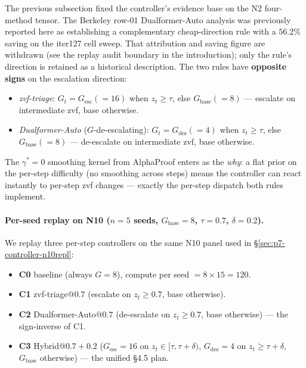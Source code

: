 The previous subsection fixed the controller's evidence base on the N2
four-method tensor. The Berkeley row-01 Dualformer-Auto analysis
\citep{su2024dualformer} was previously reported here as establishing a
complementary cheap-direction rule with a $56.2\%$ saving on the iter127
cell sweep. That attribution and saving figure are withdrawn (see
the replay audit boundary in the introduction); only the rule's
direction is retained as a historical description. The two rules have
\textbf{opposite signs} on the escalation direction:
\begin{itemize}
\item \emph{zvf-triage}: $G_t = G_{\mathrm{esc}} (=16)$ when $z_t \geq \tau$, else $G_{\mathrm{base}} (=8)$ --- escalate on intermediate zvf, base otherwise.
\item \emph{Dualformer-Auto} ($G$-de-escalating): $G_t = G_{\mathrm{des}} (=4)$ when $z_t \geq \tau$, else $G_{\mathrm{base}} (=8)$ --- de-escalate on intermediate zvf, base otherwise.
\end{itemize}
The $\gamma^{*}{=}0$ smoothing kernel from AlphaProof \citep{alphaproof2025nature}
enters as the \emph{why}: a flat prior on the per-step difficulty (no smoothing
across steps) means the controller can react instantly to per-step zvf changes
--- exactly the per-step dispatch both rules implement.

\paragraph{Per-seed replay on N10 ($n{=}5$ seeds, $G_{\mathrm{base}}{=}8$, $\tau{=}0.7$, $\delta{=}0.2$).}
We replay three per-step controllers on the same N10 panel used in
\S\ref{sec:p7-controller-n10repl}:
\begin{itemize}
\item \textbf{C0} baseline (always $G{=}8$), compute per seed $= 8 \times 15 = 120$.
\item \textbf{C1} zvf-triage@$0.7$ (escalate on $z_t \geq 0.7$, base otherwise).
\item \textbf{C2} Dualformer-Auto@$0.7$ (de-escalate on $z_t \geq 0.7$, base otherwise) --- the sign-inverse of C1.
\item \textbf{C3} Hybrid@$0.7{+}0.2$ ($G_{\mathrm{esc}}{=}16$ on $z_t \in [\tau, \tau{+}\delta)$, $G_{\mathrm{des}}{=}4$ on $z_t \geq \tau{+}\delta$, $G_{\mathrm{base}}$ otherwise) --- the unified §4.5 plan.
\end{itemize}

